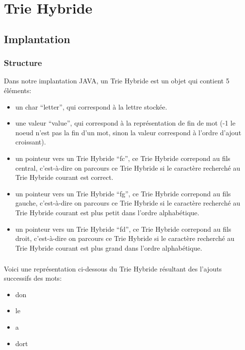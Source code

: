 \documentclass[a4paper,12pt]{report}
\begin{document}
\chapter{Trie Hybride}
\section{Implantation}
\subsection{Structure}
Dans notre implantation JAVA, un Trie Hybride est un objet qui contient 5 éléments:
\begin{itemize}
 \item un char ``letter'', qui correspond à la lettre stockée.
 \item une valeur ``value'', qui correspond à la représentation de fin de mot (-1 le noeud n'est pas la fin
 d'un mot, sinon la valeur correspond à l'ordre d'ajout croissant).
 \item un pointeur vers un Trie Hybride ``fc'', ce Trie Hybride correpond au fils central, c'est-à-dire on parcours ce
 Trie Hybride si le caractère recherché au Trie Hybride courant est correct.
 \item un pointeur vers un Trie Hybride ``fg'', ce Trie Hybride correpond au fils gauche, c'est-à-dire on parcours ce
 Trie Hybride si le caractère recherché au Trie Hybride courant est plus petit dans l'ordre alphabétique.
 \item un pointeur vers un Trie Hybride ``fd'', ce Trie Hybride correpond au fils droit, c'est-à-dire on parcours ce
 Trie Hybride si le caractère recherché au Trie Hybride courant est plus grand dans l'ordre alphabétique.
\end{itemize}

\paragraph*{}
Voici une représentation ci-dessous du Trie Hybride résultant des l'ajouts successifs des mots:
\begin{itemize}
 \item don
 \item le
 \item a
 \item dort
\end{itemize}
\end{document}
